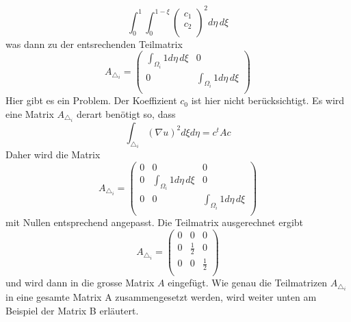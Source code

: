 \begin{equation}
			\int_0^1 \int_0^{1 - \xi} \left( \begin{array}{c} c_1 \\ c_2 \\	
\end{array} \right)^2 d\eta \, d\xi
			\label{fem:Minimal2LinAlgA}
\end{equation}
was dann zu der entsrechenden Teilmatrix
\begin{equation}
	A_{\triangle_i} = \left( \begin{array}{cc}
	\int_{\Omega_i} 1 d\eta \, d\xi & 0  \\ 
	0 & \int_{\Omega_i} 1 d\eta \, d\xi  \\
	\end{array}\right)
	\label{fem:TeilmatrixA}
\end{equation}
Hier gibt es ein Problem. Der Koeffizient $c_0$ ist hier nicht berücksichtigt. Es wird eine Matrix $A_{\triangle_i}$ derart benötigt so, dass
 \begin{equation}
	\int_{\triangle_i} (\nabla u)^2 d\xi d\eta = c^tAc
	\label{fem:KeiAhnig}
\end{equation}
Daher wird die Matrix
\begin{equation}
	A_{\triangle_i} = \left( \begin{array}{ccc}
	0 & 0 & 0 \\
	0 &  \int_{\Omega_i} 1 d\eta \, d\xi & 0  \\ 
	0 & 0 & \int_{\Omega_i} 1 d\eta \, d\xi  \\
	\end{array}\right)
	\label{fem:TeilmatrixA}
\end{equation}
mit Nullen entsprechend angepasst. Die Teilmatrix ausgerechnet ergibt
\begin{equation}
	A_{\triangle_i} = \left( \begin{array}{ccc}
	0 & 0 & 0 \\
	0 & \frac{1}{2} & 0  \\ 
	0 & 0 &  \frac{1}{2}\\
	\end{array}\right)
\end{equation}
und wird dann in die grosse Matrix $A$ eingefügt. Wie genau die Teilmatrizen $A_{\triangle_i}$ in eine gesamte Matrix A zusammengesetzt werden, wird weiter unten am Beispiel der Matrix B erläutert. 

